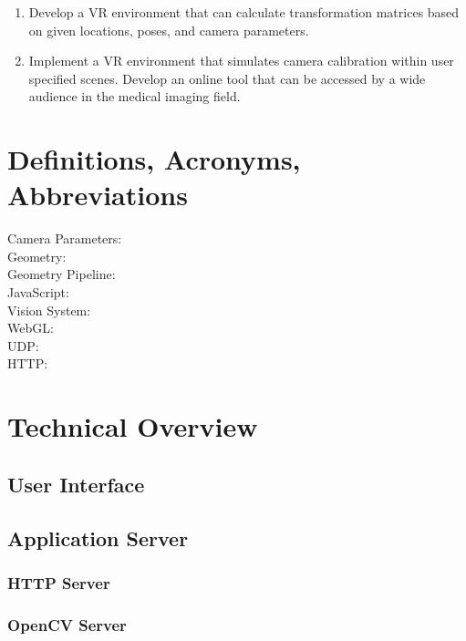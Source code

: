 \documentclass[11pt]{report}
\begin{document}
\begin{enumerate}
\item Develop a VR environment that can calculate transformation matrices based on given locations, poses, and camera parameters.  
\item Implement a VR environment that simulates camera calibration within user specified scenes. Develop an online tool that can be accessed by a wide audience in the medical imaging field.
\end{enumerate}

\section{Definitions, Acronyms, Abbreviations}

\begin{description}
\item[ Camera Parameters: ]
\item[ Geometry: ]
\item[ Geometry Pipeline: ]
\item[ JavaScript: ]
\item[ Vision System: ]
\item[ WebGL: ]
\item[ UDP: ]
\item[ HTTP: ]

\end{description} 

\section{Technical Overview}

\subsection{User Interface}

\subsection{Application Server}

\subsubsection{HTTP Server}

\subsubsection{OpenCV Server}
\end{document}
